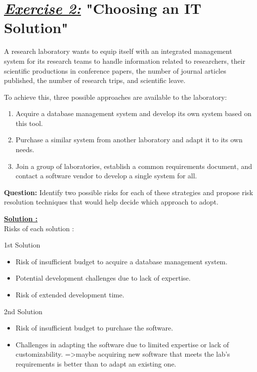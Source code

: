 
\section*{\textit{\underline{Exercise 2:}} "Choosing an IT Solution"}
A research laboratory wants to equip itself with an integrated management system for its research teams to handle information
related to researchers, their scientific productions in conference papers, the number of journal articles published, the number 
of research trips, and scientific leave.

To achieve this, three possible approaches are available to the laboratory: 
\begin{enumerate}
    \item Acquire a database management system and develop its own system based on this tool. 
    \item Purchase a similar system from another laboratory and adapt it to its own needs. 
    \item Join a group of laboratories, establish a common requirements document, and contact a software vendor to develop a
single system for all. 
\end{enumerate}

\textbf{Question:} Identify two possible risks for each of these strategies and propose risk resolution techniques that would help
decide which approach to adopt.

\vspace{1.5cm}

{\textbf{\underline{\large{Solution} :}}\\

Risks of each solution :

\vspace{0.5cm}
\hspace{0.5cm}1st Solution 
\begin{itemize}
    \item Risk of insufficient budget to acquire a database management system.
    \item Potential development challenges due to lack of expertise.
    \item Risk of extended development time.
\end{itemize}
}

\hspace{0.5cm}2nd Solution 
\begin{itemize}
    \item Risk of insufficient budget to purchase the software.
    \item Challenges in adapting the software due to limited expertise or lack of customizability. =\textgreater maybe 
acquiring new software that meets the lab's requirements is better than to adapt an existing one.
\end{itemize}

